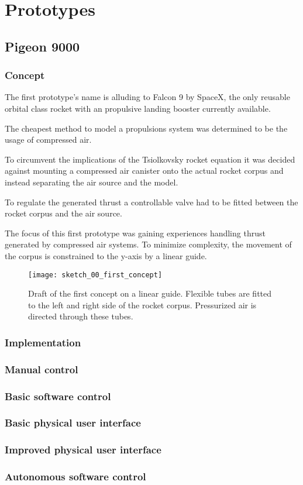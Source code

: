 \chapter{Prototypes}

\section{Pigeon 9000}

\subsection{Concept}
The first prototype's name is alluding to Falcon 9 by SpaceX, the only reusable orbital class rocket with an propulsive landing booster currently available. 

The cheapest method to model a propulsions system was determined to be the usage of compressed air. 

To circumvent the implications of the Tsiolkovsky rocket equation it was decided against mounting a compressed air canister onto the actual rocket corpus and instead separating the air source and the model.

To regulate the generated thrust a controllable valve had to be fitted between the rocket corpus and the air source. 

The focus of this first prototype was gaining experiences handling thrust generated by compressed air systems. To minimize complexity, the movement of the corpus is constrained to the y-axis by a linear guide.

\begin{figure}[hp]
\centering

\texttt{[image: sketch\_00\_first\_concept]}

\caption{Draft of the first concept on a linear guide. Flexible tubes are fitted to the left and right side of the rocket corpus. Pressurized air is directed through these tubes.}
\end{figure}

   
\subsection{Implementation}


\subsection{Manual control}


\subsection{Basic software control}


\subsection{Basic physical user interface}


\subsection{Improved physical user interface}


\subsection{Autonomous software control}